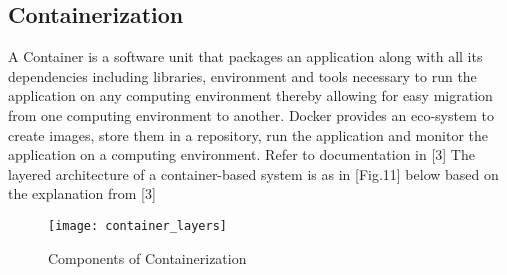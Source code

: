 \subsection{Containerization}

\begin{flushleft}
A Container is a software unit that packages an application along with all its dependencies including libraries, environment and tools necessary to run the application on any computing environment thereby allowing for easy migration from one computing environment to another. Docker provides an eco-system to create images, store them in a repository, run the application and monitor the application on a computing environment. Refer to documentation in [3]
The layered architecture of a container-based system is as in [Fig.11] below based on the explanation from [3]
\end{flushleft}

\begin{figure}
    \centering
    \texttt{[image: container\_layers]}
    \label{fig:figure9}
    \caption{Components of Containerization}
\end{figure}

